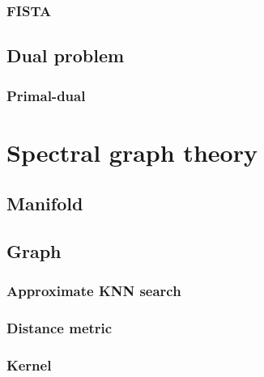 \documentclass[a4paper,12pt,twoside]{report}
\begin{document}
\subsection{FISTA}

\section{Dual problem}

\subsection{Primal-dual}

\chapter{Spectral graph theory}

\section{Manifold}

\section{Graph}

\subsection{Approximate KNN search}

\subsection{Distance metric}

\subsection{Kernel}
\end{document}
